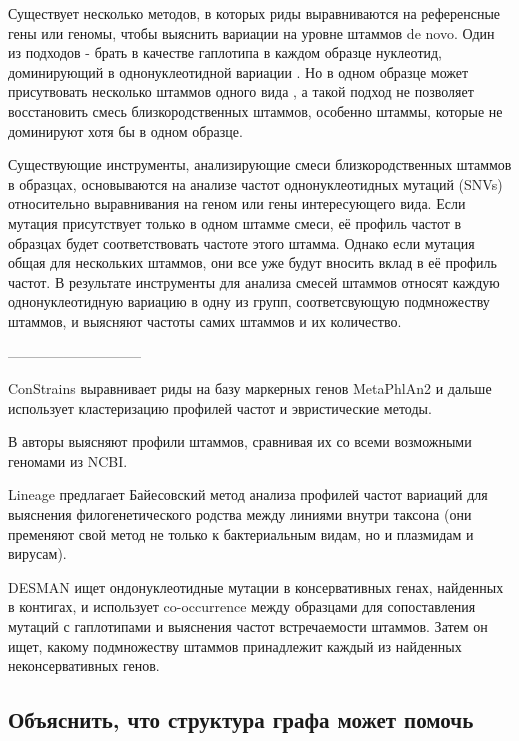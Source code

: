 \documentclass{spbau-diploma}
\begin{document}
Существует несколько методов, в которых риды выравниваются на референсные гены или геномы, чтобы выяснить вариации на уровне штаммов de novo. Один из подходов \-- брать в качестве гаплотипа в каждом образце нуклеотид, доминирующий в однонуклеотидной вариации \cite{ref_based1, ref_based2}. Но в одном образце может присутвовать несколько штаммов одного вида \cite{infant_gut, metasub, StrainEst}, а такой подход не позволяет восстановить смесь близкородственных штаммов, особенно штаммы, которые не доминируют хотя бы в одном образце.

Существующие инструменты, анализирующие смеси близкородственных штаммов в образцах, основываются на анализе частот однонуклеотидных мутаций (SNVs) относительно выравнивания на геном или гены интересующего вида. Если мутация присутствует только в одном штамме смеси, её профиль частот в образцах будет соответствовать частоте этого штамма. Однако если мутация общая для нескольких штаммов, они все уже будут вносить вклад в её профиль частот. В результате инструменты для анализа смесей штаммов относят каждую однонуклеотидную вариацию в одну из групп, соответсвующую подмножеству штаммов, и выясняют частоты самих штаммов и их количество.

-----------------------------

ConStrains \cite{Constrains} выравнивает риды на базу маркерных генов MetaPhlAn2 \cite{MetaPhlAn2} и дальше использует кластеризацию профилей частот и эвристические методы. 

В \cite{StrainEst} авторы выясняют профили штаммов, сравнивая их со всеми возможными геномами из NCBI.

Lineage \cite{Lineage} предлагает Байесовский метод анализа профилей частот вариаций для выяснения филогенетического родства между линиями внутри таксона (они пременяют свой метод не только к бактериальным видам, но и плазмидам и вирусам).

DESMAN \cite{DESMAN} ищет ондонуклеотидные мутации в консервативных генах, найденных в контигах, и использует co-occurrence между образцами для сопоставления мутаций с гаплотипами и выяснения частот встречаемости штаммов. Затем он ищет, какому подмножеству штаммов принадлежит каждый из найденных неконсервативных генов. 


\subsection{Объяснить, что структура графа может помочь }
\end{document}
